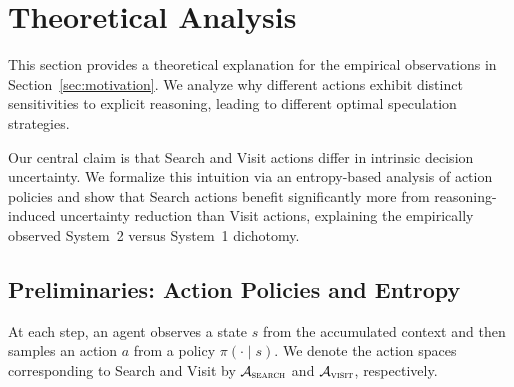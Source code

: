 \section{Theoretical Analysis}
\label{sec:theory}



This section provides a theoretical explanation for the empirical observations in Section~\ref{sec:motivation}.
We analyze why different actions exhibit distinct sensitivities to explicit reasoning, leading to different optimal speculation strategies.

Our central claim is that Search and Visit actions differ in intrinsic decision uncertainty.
We formalize this intuition via an entropy-based analysis of action policies and show that Search actions benefit significantly more from reasoning-induced uncertainty reduction than Visit actions, explaining the empirically observed System~2 versus System~1 dichotomy.


\subsection{Preliminaries: Action Policies and Entropy}

At each step, an agent observes a state $s$ from the accumulated context and then samples an action $a$ 
from a policy $\pi(\cdot \mid s)$.
We denote the action spaces corresponding to Search and Visit by $\mathcal{A}_{\textsc{search}}$ and $\mathcal{A}_{\textsc{visit}}$, respectively.



